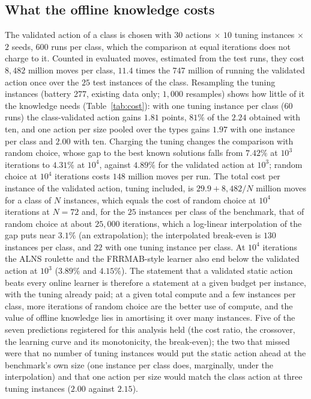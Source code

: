 


\subsection{What the offline knowledge costs}
\label{sec:cost}
The validated action of a class is chosen with $30$ actions $\times$ $10$ tuning instances $\times$ $2$ seeds, $600$ runs per class, which the comparison at equal iterations does not charge to it. Counted in evaluated moves, estimated from the test runs, they cost $8{,}482$ million moves per class, $11.4$ times the $747$ million of running the validated action once over the $25$ test instances of the class. Resampling the tuning instances (battery 277, existing data only; $1{,}000$ resamples) shows how little of it the knowledge needs (Table~\ref{tab:cost}): with one tuning instance per class ($60$ runs) the class-validated action gains $1.81$ points, $81\%$ of the $2.24$ obtained with ten, and one action per size pooled over the types gains $1.97$ with one instance per class and $2.00$ with ten. Charging the tuning changes the comparison with random choice, whose gap to the best known solutions falls from $7.42\%$ at $10^3$ iterations to $4.31\%$ at $10^4$, against $4.89\%$ for the validated action at $10^3$; random choice at $10^4$ iterations costs $148$ million moves per run. The total cost per instance of the validated action, tuning included, is $29.9+8{,}482/N$ million moves for a class of $N$ instances, which equals the cost of random choice at $10^4$ iterations at $N=72$ and, for the $25$ instances per class of the benchmark, that of random choice at about $25{,}000$ iterations, which a log-linear interpolation of the gap puts near $3.1\%$ (an extrapolation); the interpolated break-even is $130$ instances per class, and $22$ with one tuning instance per class. At $10^4$ iterations the ALNS roulette and the FRRMAB-style learner also end below the validated action at $10^3$ ($3.89\%$ and $4.15\%$). The statement that a validated static action beats every online learner is therefore a statement at a given budget per instance, with the tuning already paid; at a given total compute and a few instances per class, more iterations of random choice are the better use of compute, and the value of offline knowledge lies in amortising it over many instances. Five of the seven predictions registered for this analysis held (the cost ratio, the crossover, the learning curve and its monotonicity, the break-even); the two that missed were that no number of tuning instances would put the static action ahead at the benchmark's own size (one instance per class does, marginally, under the interpolation) and that one action per size would match the class action at three tuning instances ($2.00$ against $2.15$).

